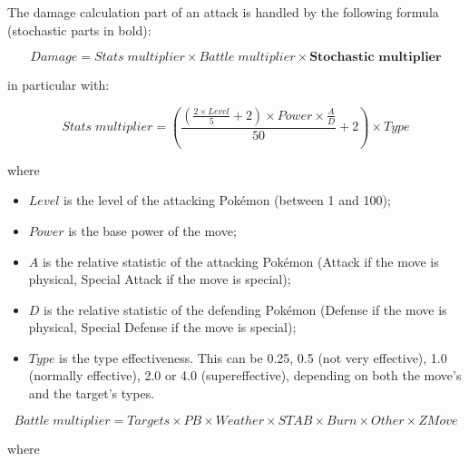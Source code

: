\documentclass{article}
\begin{document}
The damage calculation part of an attack is handled by the following formula \cite{Damage} (stochastic parts in bold):

\begin{equation}
    Damage = Stats \; multiplier \times Battle \; multiplier \times \textbf{Stochastic multiplier}
\end{equation}

in particular with:

\begin{equation}
    Stats \; multiplier = \left(\frac{\left(\frac{2 \times Level}{5} + 2\right) \times Power \times \frac{A}{D}}{50} + 2 \right) \times Type
\end{equation}

where

\begin{itemize}
    \item $Level$ is the level of the attacking Pokémon (between 1 and 100);
    \item $Power$ is the base power of the move;
    \item $A$ is the relative statistic of the attacking Pokémon (Attack if the move is physical, Special Attack if the move is special);
    \item $D$ is the relative statistic of the defending Pokémon (Defense if the move is physical, Special Defense if the move is special);
    \item $Type$ is the type effectiveness. This can be 0.25, 0.5 (not very effective), 1.0 (normally effective), 2.0 or 4.0 (supereffective), depending on both the move's and the target's types.
\end{itemize}

\begin{equation}
    Battle \; multiplier = Targets \times PB \times Weather \times STAB \times Burn \times Other \times ZMove
\end{equation}

where
\end{document}
